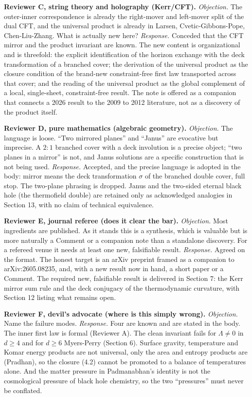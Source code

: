 \documentclass[11pt]{article}
\begin{document}
\textbf{Reviewer C, string theory and holography (Kerr/CFT).}
\emph{Objection.} The outer-inner correspondence is already the right-mover and left-mover split of the dual CFT, and the universal product is already in Larsen, Cvetic-Gibbons-Pope, Chen-Liu-Zhang. What is actually new here?
\emph{Response.} Conceded that the CFT mirror and the product invariant are known. The new content is organizational and is threefold: the explicit identification of the horizon exchange with the deck transformation of a branched cover; the derivation of the universal product as the closure condition of the brand-new constraint-free first law transported across that cover; and the reading of the universal product as the global complement of a local, single-sheet, constraint-free result. The note is offered as a companion that connects a 2026 result to the 2009 to 2012 literature, not as a discovery of the product itself.

\textbf{Reviewer D, pure mathematics (algebraic geometry).}
\emph{Objection.} The language is loose. ``Two mirrored planes'' and ``Janus'' are evocative but imprecise. A $2{:}1$ branched cover with a deck involution is a precise object; ``two planes in a mirror'' is not, and Janus solutions are a specific construction that is not being used.
\emph{Response.} Accepted, and the precise language is adopted in the body: mirror means the deck transformation $\sigma$ of the branched double cover, full stop. The two-plane phrasing is dropped. Janus and the two-sided eternal black hole (the thermofield double) are retained only as acknowledged analogies in Section 13, with no claim of technical equivalence.

\textbf{Reviewer E, journal referee (does it clear the bar).}
\emph{Objection.} Most ingredients are published. As it stands this is a synthesis, which is valuable but is more naturally a Comment or a companion note than a standalone discovery. For a refereed venue it needs at least one new, falsifiable result.
\emph{Response.} Agreed on the format. The honest target is an arXiv preprint framed as a companion to arXiv:2605.08235, and, with a new result now in hand, a short paper or a Comment. The required new, falsifiable result is delivered in Section 7: the Kerr mirror sum rule and the deck conjugacy of the thermodynamic curvature, with Section 12 listing what remains open.

\textbf{Reviewer F, devil's advocate (where is this simply wrong).}
\emph{Objection.} Name the failure modes.
\emph{Response.} Four are known and are stated in the body. The inner first law is formal (Reviewer A). The clean invariant fails for $\Lambda \ne 0$ in $d \ge 4$ and for $d \ge 6$ Myers-Perry (Section 6). Surface gravity, temperature and Komar energy products are not universal, only the area and entropy products are (Pradhan), so the closure (4.2) cannot be promoted to a balance of temperatures alone. And the matter pressure in Padmanabhan's identity is not the cosmological pressure of black hole chemistry, so the two ``pressures'' must never be conflated.
\end{document}
